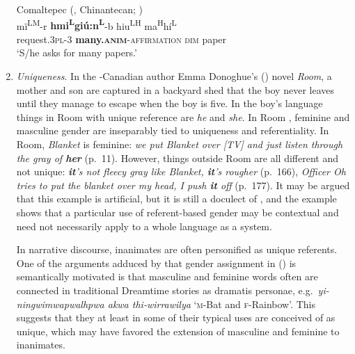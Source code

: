 \documentclass[output=collectionpaper]{langsci/langscibook}
\begin{document}
\begin{enumerate}[label=(\roman*)]
\ea\label{ex:WDG:7}
Comaltepec  (, Chinantecan; \citealt[57]{Anderson1989a})\\
\gll mï\textsuperscript{LM}-r	\textbf{hmi\textsuperscript{L}giú:n\textsuperscript{L}}-b	hiu\textsuperscript{LH}	ma\textsuperscript{H}hí\textsuperscript{L}\\
	request.3\textsc{pl}-3	\textbf{many.\textsc{anim}}-\textsc{affirmation}	\textsc{dim}	paper\\
\glt	`S/he asks for many papers.'\\
\z

\item \textit{Uniqueness}. In the -Canadian author Emma Donoghue's (\citealt*{Donoghue2010}) novel \textit{Room}, a mother and son are captured in a backyard shed that the boy never leaves until they manage to escape when the boy is five. In the boy's language things in Room with unique reference are \textit{he} and \textit{she}. In Room , feminine and masculine gender are inseparably tied to uniqueness and referentiality. In Room, \textit{Blanket} is feminine: \textit{we put Blanket over [TV] and just listen through the gray of \textbf{her}} (p.~11). However, things outside Room are all different and not unique: \textit{\textbf{it}'s not fleecy gray like Blanket, \textbf{it}'s rougher} (p.~166), \textit{Officer Oh tries to put the blanket over my head, I push \textbf{it} off} (p.~177). It may be argued that this example is artificial, but it is still a doculect of , and the example shows that a particular use of referent-based gender may be contextual and need not necessarily apply to a whole language as a system.

In narrative discourse, inanimates are often personified as unique referents. One of the arguments adduced by \cite[232]{Leeding1989} that gender assignment in  () is semantically motivated is that masculine and feminine words often are connected in traditional Dreamtime stories as dramatis personae, e.g.\ \textit{yi-ningwimwapwalhpwa akwa thi-wirrawilya} `\textsc{m}-Bat and \textsc{f}-Rainbow'. This suggests that they at least in some of their typical uses are conceived of as unique, which may have favored the extension of masculine and feminine to inanimates.


\end{enumerate}
\end{document}
